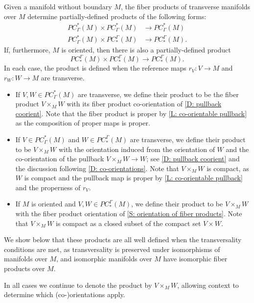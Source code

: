 \begin{definition}\label{D: PC products}
	Given a manifold without boundary $M$, the fiber products of transverse manifolds over $M$ determine partially-defined products of the following forms:
	\begin{align*}
		PC^*_\Gamma(M) \times PC^*_\Gamma(M)& \to PC^*_\Gamma(M)\\
		PC^*_\Gamma(M) \times PC_*^\Gamma(M)& \to PC_*^\Gamma(M).
	\end{align*}
	If, furthermore, $M$ is oriented, then there is also a partially-defined product
	$$PC_*^\Gamma(M) \times PC_*^\Gamma(M) \to PC_*^\Gamma(M).$$
	In each case, the product is defined when the reference maps $r_V \colon V \to M$ and $r_W \colon W \to M$ are transverse.

		\begin{itemize}
			\item If $V,W\in PC^*_\Gamma(M)$ are transverse, we define their product to be the fiber product $V \times_M W$ with its fiber product co-orientation of \cref{D: pullback coorient}. Note that the fiber product is proper by \cref{L: co-orientable pullback} as the composition of proper maps is proper.

			\item If $V \in PC^*_\Gamma(M)$ and $W \in PC_*^\Gamma(M)$ are transverse, we define their product to be $V \times_M W$ with the orientation induced from the orientation of $W$ and the co-orientation of the pullback $V \times_M W \to W$; see \cref{D: pullback coorient} and  the discussion following \cref{D: co-orientations}.
			Note that $V \times_M W$ is compact, as $W$ is compact and the pullback map is proper by \cref{L: co-orientable pullback} and the properness of $r_V$.

			\item If $M$ is oriented and $V,W \in PC_*^\Gamma(M)$, we define their product to be $V \times_M W$ with the fiber product orientation of \cref{S: orientation of fiber products}.
			Note that $V \times_M W$ is compact as a closed subset of the compact set $V \times W$.
	\end{itemize}

	We show below that these products are all well defined when the transversality conditions are met, as transversality is preserved under isomorphisms of manifolds over $M$, and isomorphic manifolds over $M$ have isomorphic fiber products over $M$.

	In all cases we continue to denote the product by $V \times_M W$, allowing context to determine which (co\nobreakdash-)orientations apply.
\end{definition}



